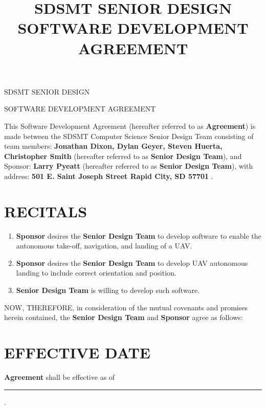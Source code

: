 \documentclass[11pt]{article}
\title{SDSMT SENIOR DESIGN SOFTWARE DEVELOPMENT AGREEMENT}
\begin{document}


{\Large \bf 
\centerline{SDSMT SENIOR DESIGN}\centerline{SOFTWARE DEVELOPMENT AGREEMENT}
}
\vspace{\baselineskip}

This Software Development Agreement (hereafter referred to as \textbf{Agreement}) is made between the SDSMT  Computer Science Senior Design Team  consisting of team members: \textbf{Jonathan Dixon, Dylan Geyer, Steven Huerta, Christopher Smith} (hereafter referred to as \textbf{Senior Design Team}),  and  Sponsor: \textbf{Larry Pyeatt} (hereafter referred to as \textbf{Senior Design Team}),  with address:  \textbf{501 E. Saint Joseph Street Rapid City, SD 57701} . 



\section{RECITALS}
\begin{enumerate}  \itemsep4pt \parskip0pt 
\item \textbf{Sponsor} desires  the \textbf{Senior Design Team} to develop software to enable the autonomous take-off, navigation, and landing of a UAV.

\item \textbf{Sponsor} desires  the \textbf{Senior Design Team} to develop UAV autonomous landing to include correct orientation and position.

\item \textbf{Senior Design Team} is willing to develop such software.

\end{enumerate}
NOW, THEREFORE, in consideration of the mutual covenants and promises herein contained, the \textbf{Senior Design Team} and \textbf{Sponsor} agree as follows:  

\section{EFFECTIVE DATE }

\textbf{Agreement} shall be effective as of \rule{4cm}{0.4pt}.  
\end{document}

